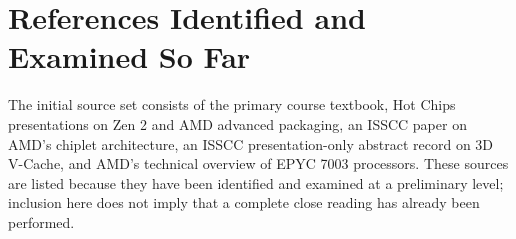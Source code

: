 \section{References Identified and Examined So Far}
\label{sec:sources}

The initial source set consists of the primary course textbook, Hot Chips presentations on Zen 2 and AMD advanced packaging, an ISSCC paper on AMD's chiplet architecture, an ISSCC presentation-only abstract record on 3D V-Cache, and AMD's technical overview of EPYC 7003 processors. These sources are listed because they have been identified and examined at a preliminary level; inclusion here does not imply that a complete close reading has already been performed.

\nocite{sarangi2025basic,suggs2019zen2,naffziger2020chiplet,wuu2022vcache,swaminathanAdvancedPackagingEnabling2021,amd2022epyc7003}
\printbibliography[heading=subbibliography,title={Initial bibliography}]
